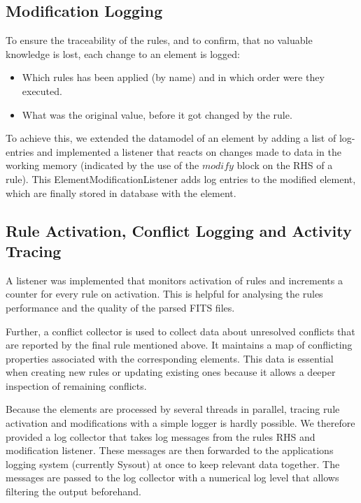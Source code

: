\documentclass[a4paper,12pt]{article}
\begin{document}
\subsection{Modification Logging}

To ensure the traceability of the rules, and to confirm, that no valuable knowledge is lost, each change to an element is logged:
\begin{itemize}
\item Which rules has been applied (by name) and in which order were they executed.
\item What was the original value, before it got changed by the rule.
\end{itemize}

To achieve this, we extended the datamodel of an element by adding a list of log-entries and implemented a listener that reacts on changes made to data in the working memory (indicated by the use of the $modify$ block on the RHS of a rule). This ElementModificationListener adds log entries to the modified element, which are finally stored in database with the element.

\subsection{Rule Activation, Conflict Logging and Activity Tracing}

A listener was implemented that monitors activation of rules and increments a counter for every rule on activation. This is helpful for analysing the rules performance and the quality of the parsed FITS files.

Further, a conflict collector is used to collect data about unresolved conflicts that are reported by the final rule mentioned above. It maintains a map of conflicting properties associated with the corresponding elements. This data is essential when creating new rules or updating existing ones because it allows a deeper inspection of remaining conflicts.

Because the elements are processed by several threads in parallel, tracing rule activation and modifications with a simple logger is hardly possible. We therefore provided a log collector that takes log messages from the rules RHS and modification listener. These messages are then forwarded to the applications logging system (currently Sysout) at once to keep relevant data together. The messages are passed to the log collector with a numerical log level that allows filtering the output beforehand.
\end{document}
